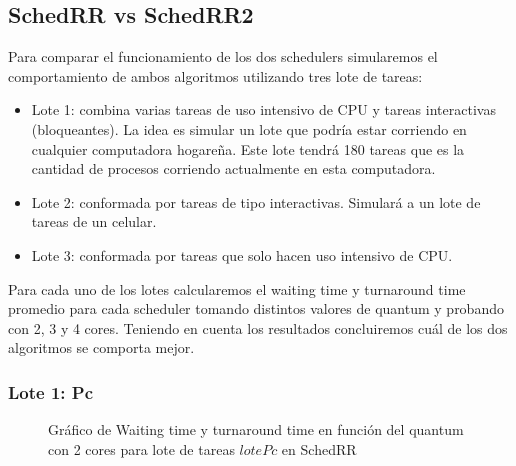 \subsection{SchedRR vs SchedRR2}

Para comparar el funcionamiento de los dos schedulers simularemos el comportamiento de ambos algoritmos utilizando tres lote de tareas:
\begin{itemize}
	\item Lote 1: combina varias tareas de uso intensivo de CPU y tareas interactivas (bloqueantes). La idea es simular un lote que podría estar corriendo en cualquier computadora hogareña. Este lote tendrá 180 tareas que es la cantidad de procesos corriendo actualmente en esta computadora.
	\item Lote 2: conformada por tareas de tipo interactivas. Simulará a un lote de tareas de un celular.
	\item Lote 3: conformada por tareas que solo hacen uso intensivo de CPU.
\end{itemize}
Para cada uno de los lotes calcularemos el waiting time y turnaround time promedio para cada scheduler tomando distintos valores de quantum y probando con 2, 3 y 4 cores. Teniendo en cuenta los resultados concluiremos cuál de los dos algoritmos se comporta mejor.

\subsubsection{Lote 1: Pc}

\begin{figure}[H]
\hfill
{}
\hfill
{}
\hfill
\caption{Gráfico de Waiting time y turnaround time en función del quantum con 2 cores para lote de tareas $lotePc$ en SchedRR}
\end{figure}

